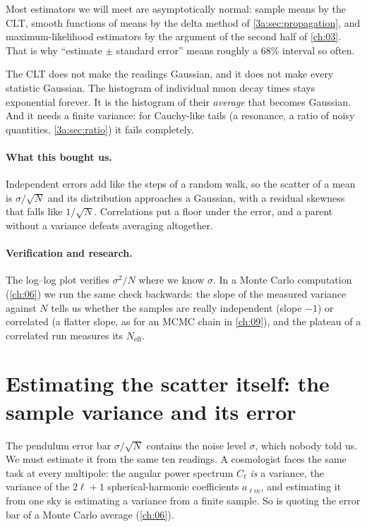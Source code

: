 Most estimators we will meet are asymptotically normal: sample means by the
CLT, smooth functions of means by the delta method of
\cref{3a:sec:propagation}, and maximum-likelihood estimators by the argument
of the second half of \cref{ch:03}. That is why ``estimate $\pm$ standard
error'' means roughly a 68\% interval so often.

\begin{pitfall}
The CLT does not make the readings Gaussian, and it does not make every
statistic Gaussian. The histogram of individual muon decay times stays
exponential forever. It is the histogram of their \emph{average} that
becomes Gaussian. And it needs a finite variance: for Cauchy-like tails (a
resonance, a ratio of noisy quantities, \cref{3a:sec:ratio}) it fails
completely.
\end{pitfall}

\paragraph{What this bought us.}
Independent errors add like the steps of a random walk, so the scatter of a
mean is $\sigma/\sqrt N$ and its distribution approaches a Gaussian, with a
residual skewness that falls like $1/\sqrt N$. Correlations put a floor under
the error, and a parent without a variance defeats averaging altogether.

\paragraph{Verification and research.}
The log--log plot verifies $\sigma^2/N$ where we know $\sigma$. In a
Monte Carlo computation (\cref{ch:06}) we run the same check backwards: the
slope of the measured variance against $N$ tells us whether the samples are
really independent (slope $-1$) or correlated (a flatter slope, as for an
MCMC chain in \cref{ch:09}), and the plateau of a correlated run measures its
$N_{\mathrm{eff}}$.

\section{Estimating the scatter itself: the sample variance and its error}
\label{3a:sec:sample-variance}

The pendulum error bar $\sigma/\sqrt N$ contains the noise level $\sigma$,
which nobody told us. We must estimate it from the same ten readings. A
cosmologist faces the same task at every multipole: the angular power
spectrum $C_\ell$ \emph{is} a variance, the variance of the $2\ell+1$
spherical-harmonic coefficients $a_{\ell m}$, and estimating it from one sky
is estimating a variance from a finite sample. So is quoting the error bar
of a Monte Carlo average (\cref{ch:06}).

